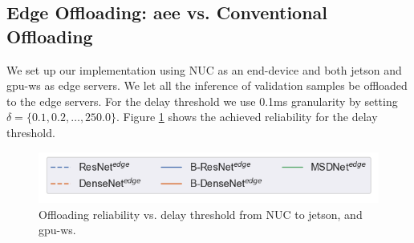 \subsection{Edge Offloading: \gls{aee} vs. Conventional Offloading}

We set up our implementation using NUC as an end-device and both \gls{jetson} and \gls{gpu-ws} as edge servers. We let all the inference of validation samples be offloaded to the edge servers. For the delay threshold we use 0.1ms granularity by setting $\delta = \{0.1,0.2, \dots, 250.0\}$. Figure \ref{fig:practical-offloading} shows the achieved reliability for the delay threshold. 

\begin{figure}
	\captionsetup[subfigure]{justification=centering,farskip=1pt,captionskip=1pt}
	\centering
	\includegraphics[width=.5\linewidth]{figures/edge/offloading_legend}
	\hfill
	\caption[Offloading Reliability]{Offloading reliability vs. delay threshold from NUC to \protect{} \gls{jetson}, and \protect{} \gls{gpu-ws}.}
	\label{fig:practical-offloading}
\end{figure}

